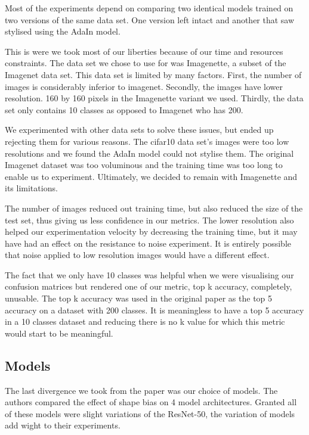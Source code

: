 \documentclass{article}
\begin{document}
Most of the experiments depend on comparing two identical models trained on two versions 
of the same data set. One version left intact and 
another that saw stylised using the AdaIn model. \medskip \par

\noindent
This is were we took most of our liberties because of our time and resources constraints.
The data set we chose to use for was Imagenette, a subset of the Imagenet data set.
This data set is limited by many factors. First, the number of images is considerably inferior to imagenet. 
Secondly, the images have lower resolution. 160 by 160 pixels in the Imagenette variant we used. 
Thirdly, the data set only contains 10 classes as opposed to Imagenet who has 200. \medskip \par

\noindent
We experimented with other data sets to solve these issues, but ended up rejecting them for various reasons. The cifar10 data set's images were too low resolutions and we found the AdaIn model could not stylise them.
The original Imagenet dataset was too voluminous and the training time was too long to enable us to experiment.
Ultimately, we decided to remain with Imagenette and its limitations. \medskip \par

\noindent
The number of images reduced out training time, but also reduced the size of the test set, thus giving us less confidence in our metrics.
The lower resolution also helped our experimentation velocity by decreasing the training time, 
but it may have had an effect on the resistance to noise experiment. 
It is entirely possible that noise applied to low resolution images would have a different effect. \medskip \par

\noindent
The fact that we only have 10 classes was helpful when we were visualising our confusion matrices but rendered one of our metric, top k accuracy, completely, unusable. The top k accuracy was used in the original paper as the top 5 accuracy on a dataset with 200 classes. It is meaningless to have a top 5 accuracy in a 10 classes dataset and reducing there is no k value for which this metric would start to be meaningful.

\subsection{Models}

The last divergence we took from the paper was our choice of models. 
The authors compared the effect of shape bias on 4 model architectures. 
Granted all of these models were slight variations of the ResNet-50, 
the variation of models add wight to their experiments. \medskip \par
\end{document}
